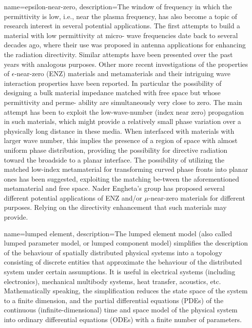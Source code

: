 {
        name=epsilon-near-zero,
        description={The window of frequency in which the permittivity is low, i.e., near the plasma frequency, has also become a topic of research interest in several potential applications. The first attempts to build a material with low permittivity at micro- wave frequencies date back to several decades ago, where their use was proposed in antenna applications for enhancing the radiation directivity. Similar attempts have been presented over the past years with analogous purposes. Other more recent investigations of the properties of $\epsilon$-near-zero (ENZ) materials and metamaterials and their intriguing wave interaction properties have been reported. In particular the possibility of designing a bulk material impedance matched with free space but whose permittivity and perme- ability are simultaneously very close to zero. The main attempt has been to exploit the low-wave-number (index near zero) propagation in such materials, which might provide a relatively small phase variation over a physically long distance in these media. When interfaced with materials with larger wave number, this implies the presence of a region of space with almost uniform phase distribution, providing the possibility for directive radiation toward the broadside to a planar interface. The possibility of utilizing the matched low-index metamaterial for transforming curved phase fronts into planar ones has been suggested, exploiting the matching be-tween the aforementioned metamaterial and free space. Nader Engheta's group has proposed several different potential applications of ENZ and/or $\mu$-near-zero materials for different purposes. Relying on the directivity enhancement that such materials may provide.\cite{alu2007epsilon}}
}

{
        name=lumped element,
        description={The lumped element model (also called lumped parameter model, or lumped component model) simplifies the description of the behaviour of spatially distributed physical systems into a topology consisting of discrete entities that approximate the behaviour of the distributed system under certain assumptions. It is useful in electrical systems (including electronics), mechanical multibody systems, heat transfer, acoustics, etc. Mathematically speaking, the simplification reduces the state space of the system to a finite dimension, and the partial differential equations (PDEs) of the continuous (infinite-dimensional) time and space model of the physical system into ordinary differential equations (ODEs) with a finite number of parameters.}
}

